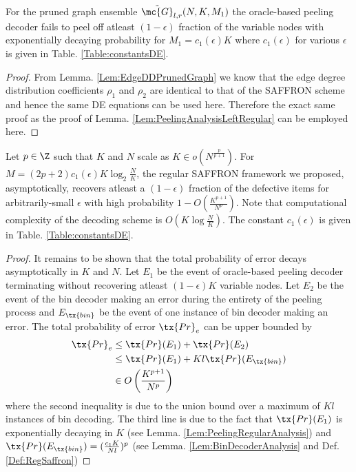 \documentclass[conference,twocolumn]{IEEEtran}
\begin{document}
\begin{lemma}
\label{Lem:PeelingRegularAnalysis}
For the pruned graph ensemble $\tilde{\mc{G}}_{l,r}(N, K,M_1)$ the oracle-based peeling decoder fails to peel off atleast $(1-\epsilon)$ fraction of the variable nodes with exponentially decaying probability for $M_1=c_1(\epsilon)K$ where $c_1(\epsilon)$ for various $\epsilon$ is given in Table. \ref{Table:constantsDE}.
\end{lemma}


\begin{proof}
From Lemma. \ref{Lem:EdgeDDPrunedGraph} we know that the edge degree distribution coefficients $\rho_1$ and $\rho_2$ are identical to that of the SAFFRON scheme and hence the same DE equations can be used here. Therefore the exact same proof as the proof of Lemma. \ref{Lem:PeelingAnalysisLeftRegular} can be employed here.
\end{proof}

\begin{theorem}
Let $p\in\Z$ such that $K$ and $N$ scale as $K\in o(N^{\frac{p}{p+1}})$. For $M=(2p+2)c_1(\epsilon)K \log_{2}\frac{N}{K}$, the regular SAFFRON framework we proposed, asymptotically, recovers atleast a $(1-\epsilon)$ fraction of the defective items for arbitrarily-small $\epsilon$ with high probability $1-O\left(\frac{K^{p+1}}{N^p}\right)$. Note that computational complexity of the decoding scheme is $O(K\log \frac{N}{K})$. The constant $c_1(\epsilon)$ is given in Table. \ref{Table:constantsDE}.
\end{theorem}
\begin{proof}
It remains to be shown that the total probability of error decays asymptotically in $K$ and $N$. Let $E_1$ be the event of oracle-based peeling decoder terminating without recovering atleast $(1-\epsilon)K$ variable nodes. Let $E_2$ be the event of the bin decoder making an error during the entirety of the peeling process and $E_{\tx{bin}}$ be the event of one instance of bin decoder making an error. The total probability of error $\tx{Pr}_e$ can be upper bounded by 
\begin{align*}
\tx{Pr}_e &\leq \tx{Pr}(E_1)+ \tx{Pr}(E_2)\\
               &\leq \tx{Pr}(E_1)+ Kl\tx{Pr}(E_{\tx{bin}})\\
               &\in O\left(\frac{K^{p+1}}{N^p}\right)
\end{align*}
where the second inequality is due to the union bound over a maximum of $Kl$ instances of bin decoding. The third line is due to the fact that $\tx{Pr}(E_1)$ is exponentially decaying in $K$ (see Lemma. \ref{Lem:PeelingRegularAnalysis}) and $\tx{Pr}(E_{\tx{bin}})=(\frac{c_1K}{Nl})^p$ (see Lemma. \ref{Lem:BinDecoderAnalysis} and Def. \ref{Def:RegSaffron})
\end{proof}
\end{document}
